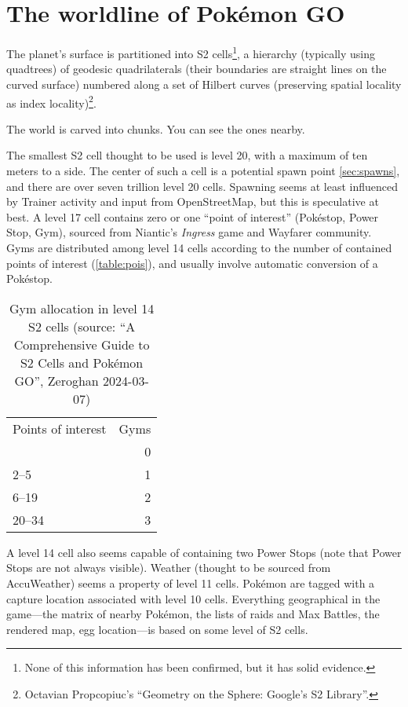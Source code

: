 \section{The worldline of Pokémon GO\label{sec:world}}
The planet's surface is partitioned into S2 cells\footnote{None of this information has been confirmed, but it has solid evidence.}, a hierarchy (typically using
 quadtrees) of geodesic quadrilaterals (their boundaries are straight lines on the curved
 surface) numbered along a set of Hilbert curves (preserving spatial locality as index locality)\footnote{Octavian Propcopiuc's ``Geometry on the Sphere: Google's S2 Library''.}.
\begin{tipbox}[title=If that meant nothing to you…]
The world is carved into chunks. You can see the ones nearby.
\end{tipbox}
The smallest S2 cell thought to be used is level 20, with a maximum of ten meters to a side.
The center of such a cell is a potential spawn point \autoref{sec:spawns}, and there are over seven trillion level 20 cells.
Spawning seems at least influenced by Trainer activity and input from OpenStreetMap, but this is speculative at best.
A level 17 cell contains zero or one ``point of interest'' (Pokéstop, Power Stop, Gym),
 sourced from Niantic's \textit{Ingress} game and Wayfarer community.
Gyms are distributed among level 14 cells according to the number of contained points of interest (\autoref{table:pois}),
 and usually involve automatic conversion of a Pokéstop.
\begin{table}
\centering
\begin{tabular}{lr}
Points of interest & Gyms\\
\Midrule
1 & 0 \\
2--5 & 1\\
6--19 & 2\\
20--34 & 3\\
\end{tabular}
\caption[Gym allocation in level 14 S2 cells]{Gym allocation in level 14 S2 cells (source: ``A Comprehensive Guide to S2 Cells and Pokémon GO'', Zeroghan 2024-03-07)\label{table:pois}}
\end{table}
A level 14 cell also seems capable of containing two Power Stops (note that Power Stops are not always visible).
 Weather (thought to be sourced from AccuWeather) seems a property of level 11 cells.
Pokémon are tagged with a capture location associated with level 10 cells.
Everything geographical in the game---the matrix of nearby Pokémon, the lists
 of raids and Max Battles, the rendered map, egg location---is based on some level of S2 cells.

